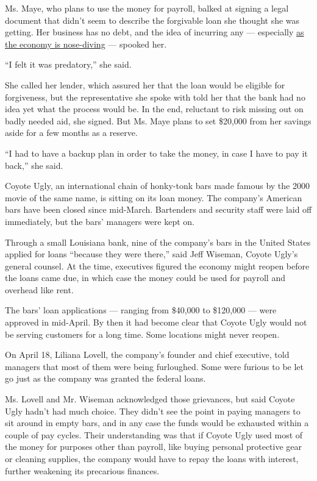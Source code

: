Ms. Maye, who plans to use the money for payroll, balked at signing a
legal document that didn't seem to describe the forgivable loan she
thought she was getting. Her business has no debt, and the idea of
incurring any --- especially
\href{https://www.nytimes3xbfgragh.onion/2020/04/29/business/economy/us-gdp.html}{as
the economy is nose-diving} --- spooked her.

``I felt it was predatory,'' she said.

She called her lender, which assured her that the loan would be eligible
for forgiveness, but the representative she spoke with told her that the
bank had no idea yet what the process would be. In the end, reluctant to
risk missing out on badly needed aid, she signed. But Ms. Maye plans to
set \$20,000 from her savings aside for a few months as a reserve.

``I had to have a backup plan in order to take the money, in case I have
to pay it back,'' she said.

Coyote Ugly, an international chain of honky-tonk bars made famous by
the 2000 movie of the same name, is sitting on its loan money. The
company's American bars have been closed since mid-March. Bartenders and
security staff were laid off immediately, but the bars' managers were
kept on.

Through a small Louisiana bank, nine of the company's bars in the United
States applied for loans ``because they were there,'' said Jeff Wiseman,
Coyote Ugly's general counsel. At the time, executives figured the
economy might reopen before the loans came due, in which case the money
could be used for payroll and overhead like rent.

The bars' loan applications --- ranging from \$40,000 to \$120,000 ---
were approved in mid-April. By then it had become clear that Coyote Ugly
would not be serving customers for a long time. Some locations might
never reopen.

On April 18, Liliana Lovell, the company's founder and chief executive,
told managers that most of them were being furloughed. Some were furious
to be let go just as the company was granted the federal loans.

Ms. Lovell and Mr. Wiseman acknowledged those grievances, but said
Coyote Ugly hadn't had much choice. They didn't see the point in paying
managers to sit around in empty bars, and in any case the funds would be
exhausted within a couple of pay cycles. Their understanding was that if
Coyote Ugly used most of the money for purposes other than payroll, like
buying personal protective gear or cleaning supplies, the company would
have to repay the loans with interest, further weakening its precarious
finances.

